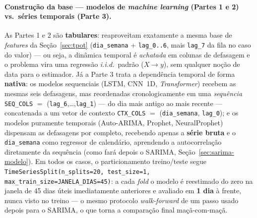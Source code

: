 \documentclass[11pt,a4paper]{article}
\begin{document}
\paragraph{Construção da base --- modelos de \emph{machine learning} (Partes 1 e 2) vs.\ séries
temporais (Parte 3).} As Partes 1 e 2 são \textbf{tabulares}: reaproveitam exatamente a mesma base
de \emph{features} da Seção~\ref{sec:tpot} (\texttt{dia\_semana} $+$ \texttt{lag\_0..6}, mais
\texttt{lag\_7} da fila no caso do valor) --- ou seja, a dinâmica temporal é \emph{achatada} em
colunas de defasagem e o problema vira uma regressão \emph{i.i.d.}\ padrão ($X\!\to\!y$), sem
qualquer noção de data para o estimador. Já a Parte 3 trata a dependência temporal de forma
\textbf{nativa}: os modelos sequenciais (LSTM, CNN~1D, \emph{Transformer}) recebem as mesmas seis
defasagens, mas reordenadas cronologicamente em uma \emph{sequência} \texttt{SEQ\_COLS} $=$
(\texttt{lag\_6},\dots,\texttt{lag\_1}) --- do dia mais antigo ao mais recente --- concatenada a um
vetor de contexto \texttt{CTX\_COLS} $=$ (\texttt{dia\_semana}, \texttt{lag\_0}); e os modelos
puramente temporais (Auto-ARIMA, Prophet, NeuralProphet) dispensam as defasagens por completo,
recebendo apenas a \textbf{série bruta} e o \texttt{dia\_semana} como regressor de calendário,
aprendendo a autocorrelação diretamente da sequência (como fará depois o SARIMA, Seção~\ref{sec:sarima-modelo}).
Em todos os casos, o particionamento treino/teste segue
\texttt{TimeSeriesSplit(n\_splits=20, test\_size=1, max\_train\_size=JANELA\_DIAS=45)}: a cada
\emph{fold} o modelo é reestimado do zero na janela de 45 dias úteis imediatamente anteriores e
avaliado em \textbf{1 dia} à frente, nunca visto no treino --- o mesmo protocolo \emph{walk-forward}
de um passo usado depois para o SARIMA, o que torna a comparação final maçã-com-maçã.
\end{document}
